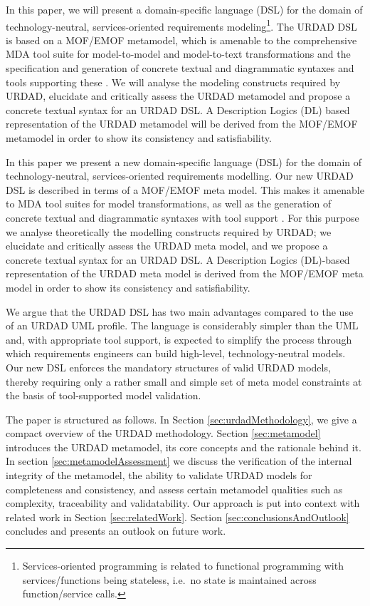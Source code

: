 In this paper, we will present a domain-specific language (DSL) for the domain of technology-neutral, services-oriented requirements modeling\footnote{Services-oriented programming is related to functional programming with services/functions being stateless, i.e.\ no state is maintained across function/service calls.}. The URDAD DSL is based on a MOF/EMOF metamodel, which is amenable to the comprehensive MDA tool suite for model-to-model and model-to-text transformations and the specification and generation of concrete textual and diagrammatic syntaxes and tools supporting these \cite{gronback_model_2008}. We will analyse the modeling constructs required by URDAD, elucidate and critically assess the URDAD metamodel and propose a concrete textual syntax for an URDAD DSL. A Description Logics (DL) based representation of the URDAD metamodel will be derived from the MOF/EMOF metamodel in order to show its consistency and satisfiability.

In this paper we present a new domain-specific language (DSL) for the domain of technology-neutral, services-oriented requirements modelling. Our new URDAD DSL is described in terms of a MOF/EMOF meta model. This makes it amenable to MDA tool suites for model transformations, as well as the generation of concrete textual and diagrammatic syntaxes with tool support \cite{gronback_model_2008}. For this purpose we analyse theoretically the modelling constructs required by URDAD; we elucidate and critically assess the URDAD meta model, and we propose a concrete textual syntax for an URDAD DSL. A Description Logics (DL)-based representation of the URDAD meta model is derived from the MOF/EMOF meta model in order to show its consistency and satisfiability.

We argue that the URDAD DSL has two main advantages compared to the use of an URDAD UML profile. The language is considerably simpler than the UML and, with appropriate tool support, is expected to simplify the process through which requirements engineers can build high-level, technology-neutral models. Our new DSL enforces the mandatory structures of valid URDAD models, thereby requiring only a rather small and simple set of meta model constraints at the basis of tool-supported model validation. 

The paper is structured as follows. In Section \ref{sec:urdadMethodology}, we give a compact overview of the URDAD methodology. Section \ref{sec:metamodel} introduces the URDAD metamodel, its core concepts and the rationale behind it. In section \ref{sec:metamodelAssessment} we discuss the verification of the internal integrity of the metamodel, the ability to validate URDAD models for completeness and consistency, and assess certain metamodel qualities such as complexity, traceability and validatability. Our approach is put into context with related work in Section \ref{sec:relatedWork}. Section \ref{sec:conclusionsAndOutlook} concludes and presents an outlook on future work.
